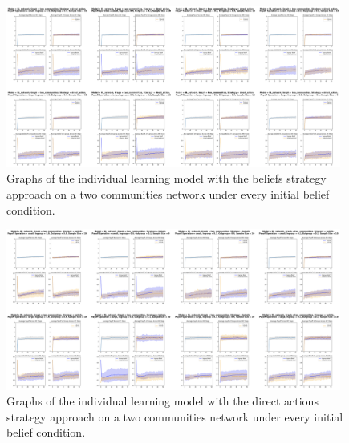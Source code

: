 \documentclass[]{llncs}
\begin{document}
\begin{figure}
\centering
\includegraphics[width=11cm]{images/individual_twocommunities1}
\caption{\label{individual_twocommunities1} Graphs of the individual learning model with the beliefs strategy approach on a two communities network under every initial belief condition.}
\end{figure}
\begin{figure}
\centering
\includegraphics[width=11cm]{images/individual_twocommunities2}
\caption{\label{individual_twocommunities2} Graphs of the individual learning model with the direct actions strategy approach on a two communities network under every initial belief condition.}
\end{figure}
 
\end{document}
